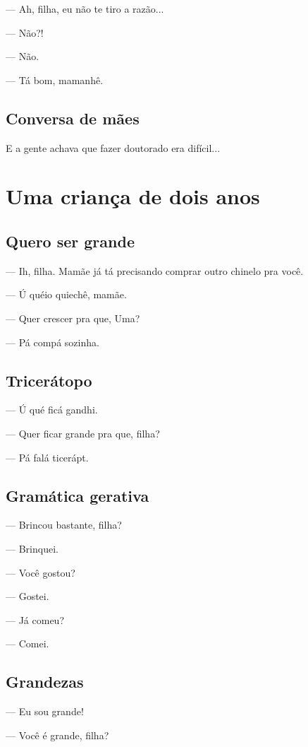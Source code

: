 — Ah, filha, eu não te tiro a razão...

— Não?!

— Não.

— Tá bom, mamanhê.

\chapter{Conversa de mães}

E a gente achava que fazer doutorado era difícil...


  \part{Uma criança de dois anos}

\chapter{Quero ser grande}

— Ih, filha. Mamãe já tá precisando comprar outro chinelo pra você.

— Ú quéio quiechê, mamãe.

— Quer crescer pra que, Uma?

— Pá compá sozinha.

\chapter{Tricerátopo}

— Ú qué ficá gandhi.

— Quer ficar grande pra que, filha?

— Pá falá ticerápt.

\chapter{Gramática gerativa}

— Brincou bastante, filha?

— Brinquei.

— Você gostou?

— Gostei.

— Já comeu?

— Comei.

\chapter{Grandezas}

— Eu sou grande!

— Você é grande, filha?

